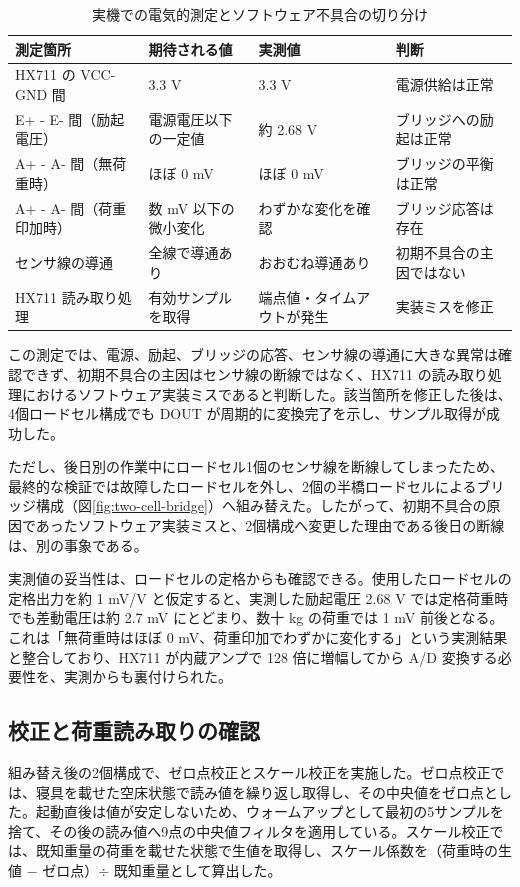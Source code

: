 \documentclass[paper=a4,fontsize=10pt,ja=standard,lualatex]{jlreq}
\begin{document}
\begin{table}[h]
\centering
\caption{実機での電気的測定とソフトウェア不具合の切り分け}
\label{tab:probe}
\begin{tabularx}{0.95\linewidth}{lYYY}
\toprule
測定箇所 & 期待される値 & 実測値 & 判断\\
\midrule
HX711 の VCC-GND 間 & 3.3 V & 3.3 V & 電源供給は正常\\
E+ - E- 間（励起電圧） & 電源電圧以下の一定値 & 約 2.68 V & ブリッジへの励起は正常\\
A+ - A- 間（無荷重時） & ほぼ 0 mV & ほぼ 0 mV & ブリッジの平衡は正常\\
A+ - A- 間（荷重印加時） & 数 mV 以下の微小変化 & わずかな変化を確認 & ブリッジ応答は存在\\
センサ線の導通 & 全線で導通あり & おおむね導通あり & 初期不具合の主因ではない\\
HX711 読み取り処理 & 有効サンプルを取得 & 端点値・タイムアウトが発生 & 実装ミスを修正\\
\bottomrule
\end{tabularx}
\end{table}

この測定では、電源、励起、ブリッジの応答、センサ線の導通に大きな異常は確認できず、初期不具合の主因はセンサ線の断線ではなく、HX711 の読み取り処理におけるソフトウェア実装ミスであると判断した。該当箇所を修正した後は、4個ロードセル構成でも DOUT が周期的に変換完了を示し、サンプル取得が成功した。

ただし、後日別の作業中にロードセル1個のセンサ線を断線してしまったため、最終的な検証では故障したロードセルを外し、2個の半橋ロードセルによるブリッジ構成（図\ref{fig:two-cell-bridge}）へ組み替えた。したがって、初期不具合の原因であったソフトウェア実装ミスと、2個構成へ変更した理由である後日の断線は、別の事象である。

実測値の妥当性は、ロードセルの定格からも確認できる。使用したロードセルの定格出力を約 1 mV/V と仮定すると、実測した励起電圧 2.68 V では定格荷重時でも差動電圧は約 2.7 mV にとどまり、数十 kg の荷重では 1 mV 前後となる。これは「無荷重時はほぼ 0 mV、荷重印加でわずかに変化する」という実測結果と整合しており、HX711 が内蔵アンプで 128 倍に増幅してから A/D 変換する必要性を、実測からも裏付けられた。

\subsection{校正と荷重読み取りの確認}

組み替え後の2個構成で、ゼロ点校正とスケール校正を実施した。ゼロ点校正では、寝具を載せた空床状態で読み値を繰り返し取得し、その中央値をゼロ点とした。起動直後は値が安定しないため、ウォームアップとして最初の5サンプルを捨て、その後の読み値へ9点の中央値フィルタを適用している。スケール校正では、既知重量の荷重を載せた状態で生値を取得し、スケール係数を（荷重時の生値 $-$ ゼロ点）$\div$ 既知重量として算出した。
\end{document}
